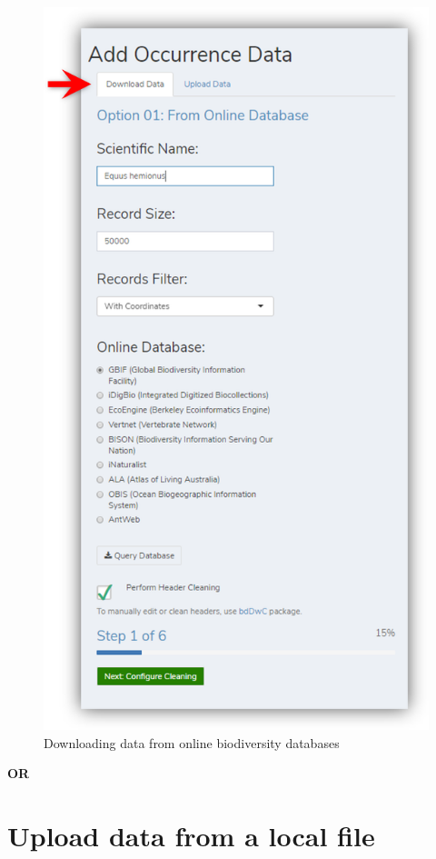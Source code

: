 \documentclass[]{book}
\begin{document}
\begin{figure}
\centering
\includegraphics{img/bdclean_downlad_data.png}
\caption{Downloading data from online biodiversity databases}
\end{figure}

\textbf{OR}

\section{Upload data from a local
file}\label{upload-data-from-a-local-file}
\end{document}
